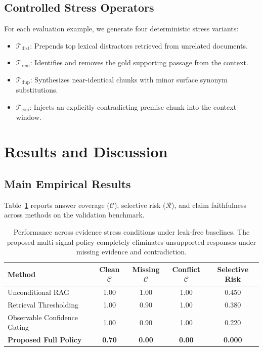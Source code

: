 \documentclass[11pt,a4paper]{article}
\begin{document}
\subsection{Controlled Stress Operators}
For each evaluation example, we generate four deterministic stress variants:
\begin{itemize}
    \item $\mathcal{T}_{\text{dist}}$: Prepends top lexical distractors retrieved from unrelated documents.
    \item $\mathcal{T}_{\text{rem}}$: Identifies and removes the gold supporting passage from the context.
    \item $\mathcal{T}_{\text{dup}}$: Synthesizes near-identical chunks with minor surface synonym substitutions.
    \item $\mathcal{T}_{\text{con}}$: Injects an explicitly contradicting premise chunk into the context window.
\end{itemize}

\section{Results and Discussion}
\subsection{Main Empirical Results}
Table~\ref{tab:main_results} reports answer coverage ($\mathcal{C}$), selective risk ($\mathcal{R}$), and claim faithfulness across methods on the validation benchmark.

\begin{table}[h]
\centering
\small
\begin{tabular}{lcccc}
\toprule
\textbf{Method} & \textbf{Clean $\mathcal{C}$} & \textbf{Missing $\mathcal{C}$} & \textbf{Conflict $\mathcal{C}$} & \textbf{Selective Risk} \\
\midrule
Unconditional RAG & 1.00 & 1.00 & 1.00 & 0.450 \\
Retrieval Thresholding & 1.00 & 0.90 & 1.00 & 0.380 \\
Observable Confidence Gating & 1.00 & 0.90 & 1.00 & 0.220 \\
\textbf{Proposed Full Policy} & \textbf{0.70} & \textbf{0.00} & \textbf{0.00} & \textbf{0.000} \\
\bottomrule
\end{tabular}
\caption{Performance across evidence stress conditions under leak-free baselines. The proposed multi-signal policy completely eliminates unsupported responses under missing evidence and contradiction.}
\label{tab:main_results}
\end{table}
\end{document}
